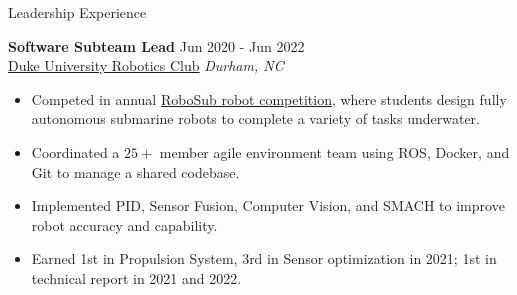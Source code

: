 \documentclass{resume}
\begin{document}
\begin{rSection}{Leadership Experience}

\textbf{Software Subteam Lead} \hfill Jun 2020 - Jun 2022\\
\href{https://duke-robotics.com/}{Duke University Robotics Club} \hfill \textit{Durham, NC}
\begin{itemize}
    \itemsep -3pt {} 
    \item Competed in annual \href{https://robonation.org/programs/robosub/}{RoboSub robot competition}, where students design fully autonomous submarine robots to complete a variety of tasks underwater.
    \item Coordinated a $25+$ member agile environment team using ROS, Docker, and Git to manage a shared codebase.
    \item Implemented PID, Sensor Fusion, Computer Vision, and SMACH to improve robot accuracy and capability.
    \item Earned 1st in Propulsion System, 3rd in Sensor optimization in 2021; 1st in technical report in 2021 and 2022.    
    \end{itemize}

\end{rSection} 

\end{document}
